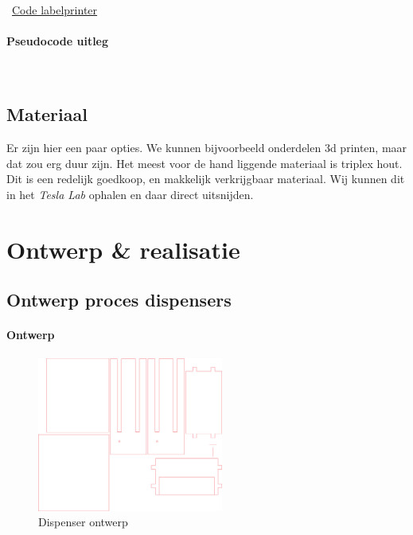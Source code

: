 \documentclass{article}
\begin{document}
\Mundus~\href{https://github.com/Gewad/Project4Bankalicious/tree/master/bonnetjesPrinten}{Code labelprinter}

\paragraph{Pseudocode uitleg}\ 



\newpage

\subsection{Materiaal}

Er zijn hier een paar opties.
We kunnen bijvoorbeeld onderdelen 3d printen, maar dat zou erg duur zijn.
Het meest voor de hand liggende materiaal is triplex hout.
Dit is een redelijk goedkoop, en makkelijk verkrijgbaar materiaal.
Wij kunnen dit in het \emph{Tesla Lab} ophalen en daar direct uitsnijden.

\newpage

\section{Ontwerp \& realisatie}

\subsection{Ontwerp proces dispensers}

\paragraph{Ontwerp}

\begin{figure}[H]
       \centering
       \includegraphics[height=2.0in]{dispenser.pdf}
       \caption{Dispenser ontwerp}
       \label{fig: Dispenser ontwerp}
\end{figure}
\end{document}
